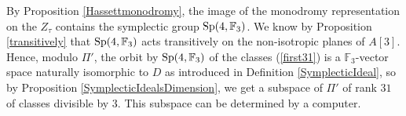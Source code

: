 By Proposition \ref{Hassettmonodromy}, the image of the monodromy representation on the $Z_\tau$ contains the symplectic group $\operatorname{Sp}(4,\mathbb F_3)$. We know by Proposition \ref{transitively} that $\operatorname{Sp}(4,\mathbb F_3)$ acts transitively on the non-isotropic planes of $A[3]$. Hence, modulo $\Pi'$, the orbit by $\operatorname{Sp}(4,\mathbb F_3)$ of the classes (\ref{first31}) is a $\mathbb F_3$-vector space naturally isomorphic to $D$ as introduced in Definition \ref{SymplecticIdeal}, so by Proposition \ref{SymplecticIdealsDimension}, we get a subspace of $\Pi'$ of rank $31$ of classes divisible by $3$.
This subspace can be determined by a computer.
